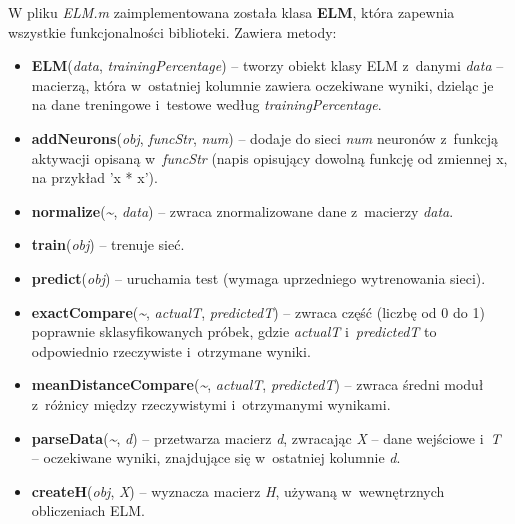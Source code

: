 \documentclass[pl]{minipw} %
\begin{document}
W pliku \textit{ELM.m} zaimplementowana została klasa \textbf{ELM}, która zapewnia wszystkie funkcjonalności biblioteki. Zawiera metody:
\begin{itemize}
\item \textbf{ELM}(\textit{data}, \textit{trainingPercentage}) -- tworzy obiekt klasy ELM z~danymi \textit{data} -- macierzą, która w~ostatniej kolumnie zawiera oczekiwane wyniki, dzieląc je na dane treningowe i~testowe według \textit{trainingPercentage}.
\item \textbf{addNeurons}(\textit{obj}, \textit{funcStr}, \textit{num}) -- dodaje do sieci \textit{num} neuronów z~funkcją aktywacji opisaną w~\textit{funcStr} (napis opisujący dowolną funkcję od zmiennej x, na przykład 'x * x').  
\item \textbf{normalize}(\textit{\~}, \textit{data}) -- zwraca znormalizowane dane z~macierzy \textit{data}.
\item \textbf{train}(\textit{obj}) -- trenuje sieć.
\item \textbf{predict}(\textit{obj}) -- uruchamia test (wymaga uprzedniego wytrenowania sieci).
\item \textbf{exactCompare}(\textit{\~}, \textit{actualT}, \textit{predictedT}) -- zwraca część (liczbę od 0 do 1) poprawnie sklasyfikowanych próbek, gdzie \textit{actualT} i~\textit{predictedT} to odpowiednio rzeczywiste i~otrzymane wyniki.
\item \textbf{meanDistanceCompare}(\textit{\~}, \textit{actualT}, \textit{predictedT}) -- zwraca średni moduł z~różnicy między rzeczywistymi i~otrzymanymi wynikami.
\item \textbf{parseData}(\textit{\~}, \textit{d}) -- przetwarza macierz \textit{d}, zwracając \textit{X} -- dane wejściowe i~\textit{T} -- oczekiwane wyniki, znajdujące się w~ostatniej kolumnie \textit{d}.
\item \textbf{createH}(\textit{obj}, \textit{X}) -- wyznacza macierz \textit{H}, używaną w~wewnętrznych obliczeniach ELM.
\end{itemize}
\clearpage
\end{document}
